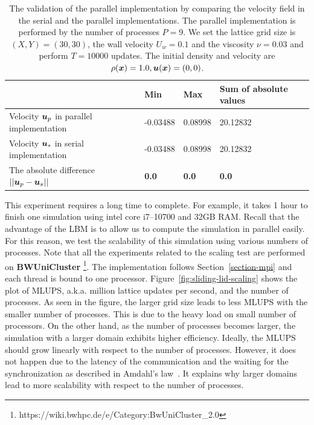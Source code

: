 \begin{table}
  \begin{center}
    \caption{The validation of the parallel implementation by comparing
    the velocity field in the serial and the parallel implementations.
    The parallel implementation is performed by the number of processes $P = 9$.
    We set the lattice grid size is $(X, Y) = (30, 30)$,
    the wall velocity $U_w = 0.1$ and the viscosity $\nu = 0.03$
    and perform $T = 10000$ updates.
    The initial density and velocity are $\rho(\boldsymbol{x}) = 1.0, \boldsymbol{u}(\boldsymbol{x}) = (0, 0)$.
    }
    \vspace{2mm}
    \label{tab:parallel-validation}
    \begin{tabular}{llll}
      \toprule
       & Min & Max & Sum of absolute values \\
      \midrule
      Velocity $\boldsymbol{u}_p$ in parallel implementation & -0.03488 & 0.08998 & 20.12832 \\
      Velocity $\boldsymbol{u}_s$ in serial implementation & -0.03488 & 0.08998 & 20.12832 \\
      The absolute difference $|| \boldsymbol{u}_p - \boldsymbol{u}_s ||$ & {\bf 0.0} & {\bf 0.0} & {\bf 0.0} \\
      \bottomrule
    \end{tabular}
  \end{center}
  \vspace{-5mm}
\end{table}

This experiment requires a long time to complete.
For example, it takes 1 hour to finish one simulation using
intel core i7--10700 and 32GB RAM.
Recall that the advantage of the LBM is to allow us to compute the simulation in
parallel easily.
For this reason, we test the scalability of this simulation using
various numbers of processes.
Note that all the experiments related to the scaling test
are performed on {\bf BWUniCluster}
\footnote{https://wiki.bwhpc.de/e/Category:BwUniCluster\_2.0}.
The implementation follows Section~\ref{section-mpi}
and each thread is bound to one processor.
Figure~\ref{fig:sliding-lid-scaling} shows the plot of
MLUPS, a.k.a. million lattice updates per second, and
the number of processes.
As seen in the figure, the larger grid size leads to
less MLUPS with the smaller number of processes.
This is due to the heavy load on small number of processors.
On the other hand, as the number of processes
becomes larger, the simulation with a larger domain exhibits
higher efficiency.
Ideally, the MLUPS should grow linearly with respect to the number of processes.
However, it does not happen due to the latency of the communication
and the waiting for the synchronization as described in Amdahl's law~\cite{amdahl1967validity}.
It explains why larger domains lead to more scalability with respect to
the number of processes.


